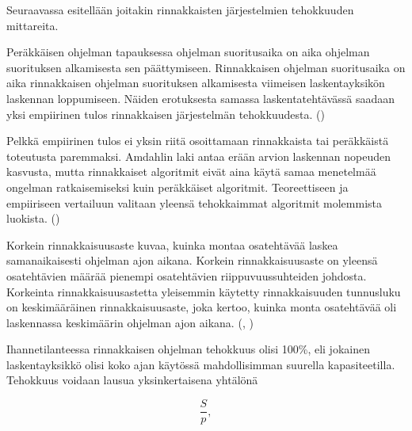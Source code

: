 Seuraavassa esitellään joitakin rinnakkaisten järjestelmien tehokkuuden
mittareita.

Peräkkäisen ohjelman tapauksessa ohjelman suoritusaika on aika ohjelman
suorituksen alkamisesta sen päättymiseen. Rinnakkaisen
ohjelman suoritusaika on aika rinnakkaisen ohjelman suorituksen alkamisesta
viimeisen laskentayksikön laskennan loppumiseen. Näiden
erotuksesta samassa laskentatehtävässä saadaan yksi empiirinen tulos
rinnakkaisen järjestelmän tehokkuudesta. (\citealt{intro})

Pelkkä empiirinen tulos ei yksin riitä osoittamaan rinnakkaista tai peräkkäistä
toteutusta paremmaksi. Amdahlin laki antaa erään arvion laskennan nopeuden
kasvusta, mutta rinnakkaiset algoritmit eivät aina käytä samaa menetelmää
ongelman ratkaisemiseksi kuin peräkkäiset algoritmit. Teoreettiseen ja
empiiriseen vertailuun valitaan yleensä tehokkaimmat algoritmit molemmista
luokista. (\citealt{intro})

Korkein rinnakkaisuusaste kuvaa, kuinka montaa osatehtävää laskea samanaikaisesti
ohjelman ajon aikana. Korkein rinnakkaisuusaste on yleensä osatehtävien määrää
pienempi osatehtävien riippuvuussuhteiden johdosta. Korkeinta
rinnakkaisuusastetta yleisemmin käytetty rinnakkaisuuden tunnusluku on
keskimääräinen rinnakkaisuusaste, joka kertoo, kuinka monta osatehtävää oli
laskennassa keskimäärin ohjelman ajon aikana. (\citealt{intro}, \citealt{rauber})

Ihannetilanteessa rinnakkaisen ohjelman tehokkuus olisi 100\%, eli jokainen
laskentayksikkö olisi koko ajan käytössä mahdollisimman suurella
kapasiteetilla. Tehokkuus voidaan lausua yksinkertaisena yhtälönä

\begin{center}
\begin{equation}\frac{S}{p},\end{equation}
\end{center}

